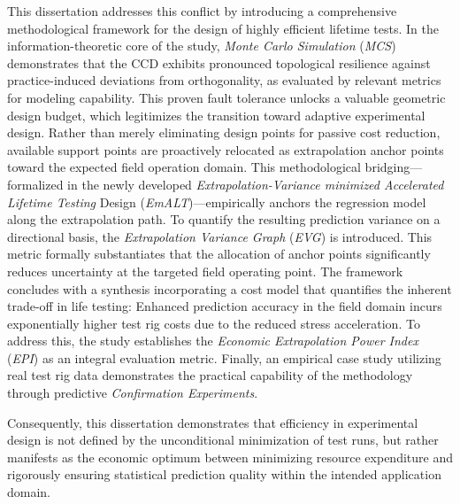 \documentclass[
 print,%
english, ngerman,%
smallfont, %
twoside, %
toc=bib,
BCOR=6mm, %
]{isw_smb_diss} %
\numberwithin{equation}{chapter} %
\begin{document}
This dissertation addresses this conflict by introducing a comprehensive methodological framework for the design of highly efficient lifetime tests. In the information-theoretic core of the study, \textit{Monte Carlo Simulation} (\textit{MCS}) demonstrates that the CCD exhibits pronounced topological resilience against practice-induced deviations from orthogonality, as evaluated by relevant metrics for modeling capability. This proven fault tolerance unlocks a valuable geometric design budget, which legitimizes the transition toward adaptive experimental design. Rather than merely eliminating design points for passive cost reduction, available support points are proactively relocated as extrapolation anchor points toward the expected field operation domain. This methodological bridging—formalized in the newly developed \textit{Extrapolation-Variance minimized Accelerated Lifetime Testing} Design (\textit{EmALT})—empirically anchors the regression model along the extrapolation path. To quantify the resulting prediction variance on a directional basis, the \textit{Extrapolation Variance Graph} (\textit{EVG}) is introduced. This metric formally substantiates that the allocation of anchor points significantly reduces uncertainty at the targeted field operating point.
The framework concludes with a synthesis incorporating a cost model that quantifies the inherent trade-off in life testing: Enhanced prediction accuracy in the field domain incurs exponentially higher test rig costs due to the reduced stress acceleration. To address this, the study establishes the \textit{Economic Extrapolation Power Index} (\textit{EPI}) as an integral evaluation metric. Finally, an empirical case study utilizing real test rig data demonstrates the practical capability of the methodology through predictive \textit{Confirmation Experiments}.

Consequently, this dissertation demonstrates that efficiency in experimental design is not defined by the unconditional minimization of test runs, but rather manifests as the economic optimum between minimizing resource expenditure and rigorously ensuring statistical prediction quality within the intended application domain.


\end{document}
